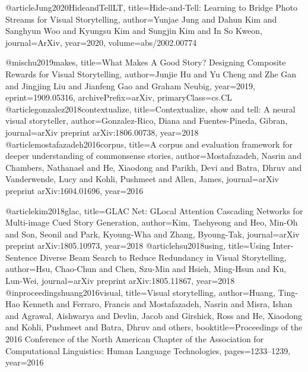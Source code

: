 @article{Jung2020HideandTellLT,
  title={Hide-and-Tell: Learning to Bridge Photo Streams for Visual Storytelling},
  author={Yunjae Jung and Dahun Kim and Sanghyun Woo and Kyungsu Kim and Sungjin Kim and In So Kweon},
  journal={ArXiv},
  year={2020},
  volume={abs/2002.00774}
}

@misc{hu2019makes,
    title={What Makes A Good Story? Designing Composite Rewards for Visual Storytelling},
    author={Junjie Hu and Yu Cheng and Zhe Gan and Jingjing Liu and Jianfeng Gao and Graham Neubig},
    year={2019},
    eprint={1909.05316},
    archivePrefix={arXiv},
    primaryClass={cs.CL}
}
@article{gonzalez2018contextualize,
  title={Contextualize, show and tell: {A} neural visual storyteller},
  author={Gonzalez-Rico, Diana and Fuentes-Pineda, Gibran},
  journal={arXiv preprint arXiv:1806.00738},
  year={2018}
}
@article{mostafazadeh2016corpus,
  title={A corpus and evaluation framework for deeper understanding of commonsense stories},
  author={Mostafazadeh, Nasrin and Chambers, Nathanael and He, Xiaodong and Parikh, Devi and Batra, Dhruv and Vanderwende, Lucy and Kohli, Pushmeet and Allen, James},
  journal={arXiv preprint arXiv:1604.01696},
  year={2016}
}

@article{kim2018glac,
  title={{GLAC Net: GLocal} {A}ttention {C}ascading {N}etworks for Multi-image Cued Story Generation},
  author={Kim, Taehyeong and Heo, Min-Oh and Son, Seonil and Park, Kyoung-Wha and Zhang, Byoung-Tak},
  journal={arXiv preprint arXiv:1805.10973},
  year={2018}
}
@article{hsu2018using,
  title={Using Inter-Sentence Diverse Beam Search to Reduce Redundancy in Visual Storytelling},
  author={Hsu, Chao-Chun and Chen, Szu-Min and Hsieh, Ming-Hsun and Ku, Lun-Wei},
  journal={arXiv preprint arXiv:1805.11867},
  year={2018}
}
@inproceedings{huang2016visual,
  title={Visual storytelling},
  author={Huang, Ting-Hao Kenneth and Ferraro, Francis and Mostafazadeh, Nasrin and Misra, Ishan and Agrawal, Aishwarya and Devlin, Jacob and Girshick, Ross and He, Xiaodong and Kohli, Pushmeet and Batra, Dhruv and others},
  booktitle={Proceedings of the 2016 Conference of the North American Chapter of the Association for Computational Linguistics: Human Language Technologies},
  pages={1233--1239},
  year={2016}
}

